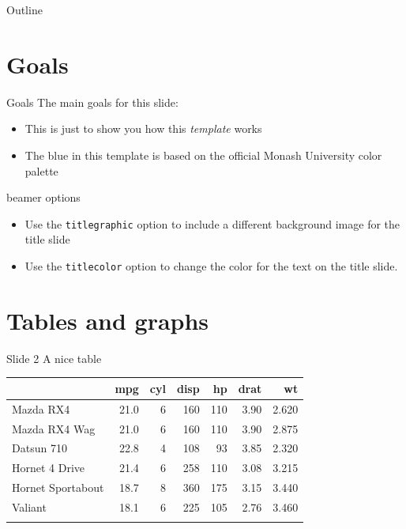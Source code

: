 \documentclass[
  14pt,
  ignorenonframetext,
  aspectratio=169,
]{beamer}
\author{Hypatia of Alexandria}
\date{18 June 2024}
\providecommand{\tightlist}{%
  \setlength{\itemsep}{0pt}\setlength{\parskip}{0pt}}\usepackage{longtable,booktabs,array}
\renewcommand*\contentsname{Table of contents}
\newcommand\contentsname{Table of contents}
\begin{document}
\frame{\titlepage}

\renewcommand*\contentsname{Outline}
\begin{frame}{Outline}
  \vspace*{0.7cm}
  \tableofcontents[hideallsubsections]
\end{frame}
\section{Goals}\label{goals}

\begin{frame}[fragile]{Goals}
\label{goals-1}
The main goals for this slide:

\begin{itemize}
\tightlist
\item
  This is just to show you how this \emph{template} works
\item
  The blue in this template is based on the official Monash University
  color palette
\end{itemize}

\begin{block}{beamer options}
\label{beamer-options}
\begin{itemize}
\tightlist
\item
  Use the \texttt{titlegraphic} option to include a different background
  image for the title slide
\item
  Use the \texttt{titlecolor} option to change the color for the text on
  the title slide.
\end{itemize}
\end{block}
\end{frame}

\section{Tables and graphs}\label{tables-and-graphs}

\begin{frame}{Slide 2}
\label{slide-2}
A nice table

\begin{longtable}[]{@{}lrrrrrr@{}}
\toprule\noalign{}
& mpg & cyl & disp & hp & drat & wt \\
\midrule\noalign{}
\endhead
Mazda RX4 & 21.0 & 6 & 160 & 110 & 3.90 & 2.620 \\
Mazda RX4 Wag & 21.0 & 6 & 160 & 110 & 3.90 & 2.875 \\
Datsun 710 & 22.8 & 4 & 108 & 93 & 3.85 & 2.320 \\
Hornet 4 Drive & 21.4 & 6 & 258 & 110 & 3.08 & 3.215 \\
Hornet Sportabout & 18.7 & 8 & 360 & 175 & 3.15 & 3.440 \\
Valiant & 18.1 & 6 & 225 & 105 & 2.76 & 3.460 \\
\bottomrule\noalign{}
\end{longtable}
\end{frame}
\end{document}
